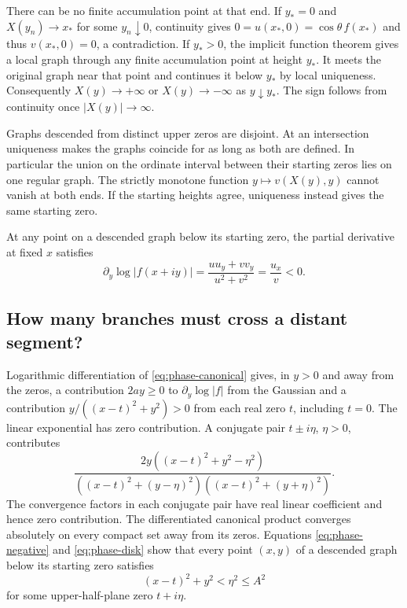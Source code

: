 \documentclass[11pt,a4paper]{article}
\numberwithin{equation}{section}
\begin{document}
There can be no finite accumulation point at that end. If $y_*=0$
and $X(y_n)\to x_*$ for some $y_n\downarrow0$, continuity gives
$0=u(x_*,0)=\cos\theta\,f(x_*)$ and thus $v(x_*,0)=0$, a
contradiction. If $y_*>0$, the implicit function theorem gives a
local graph through any finite accumulation point at height $y_*$.
It meets the original graph near that point and continues it below
$y_*$ by local uniqueness. Consequently $X(y)\to+\infty$ or
$X(y)\to-\infty$ as $y\downarrow y_*$. The sign follows from
continuity once $|X(y)|\to\infty$.

Graphs descended from distinct upper zeros are disjoint. At an
intersection uniqueness makes the graphs coincide for as long as
both are defined. In particular the union on the ordinate interval
between their starting zeros lies on one regular graph. The
strictly monotone function $y\mapsto v(X(y),y)$ cannot vanish at
both ends. If the starting heights agree, uniqueness instead gives
the same starting zero.

At any point on a descended graph below its starting zero, the
partial derivative at fixed $x$ satisfies
\begin{equation}\label{eq:phase-negative}
 \partial_y\log|f(x+iy)|=\frac{u u_y+v v_y}{u^2+v^2}
 =\frac{u_x}{v}<0 .
\end{equation}

\subsection{How many branches must cross a distant segment?}
Logarithmic differentiation of \eqref{eq:phase-canonical} gives, in
$y>0$ and away from the zeros, a contribution $2ay\ge0$ to
$\partial_y\log|f|$ from the Gaussian and a contribution
$y/((x-t)^2+y^2)>0$ from each real zero $t$, including $t=0$.
The linear exponential has zero contribution. A conjugate pair
$t\pm i\eta$, $\eta>0$, contributes
\begin{equation}\label{eq:phase-disk}
 \frac{2y((x-t)^2+y^2-\eta^2)}
 {((x-t)^2+(y-\eta)^2)((x-t)^2+(y+\eta)^2)} .
\end{equation}
The convergence factors in each conjugate pair have real linear
coefficient and hence zero contribution. The differentiated canonical
product converges absolutely on every compact set away from its zeros.
Equations \eqref{eq:phase-negative} and \eqref{eq:phase-disk} show
that every point $(x,y)$ of a descended graph below its starting zero
satisfies
\begin{equation}\label{eq:phase-cover}
 (x-t)^2+y^2<\eta^2\le A^2
\end{equation}
for some upper-half-plane zero $t+i\eta$.
\end{document}
